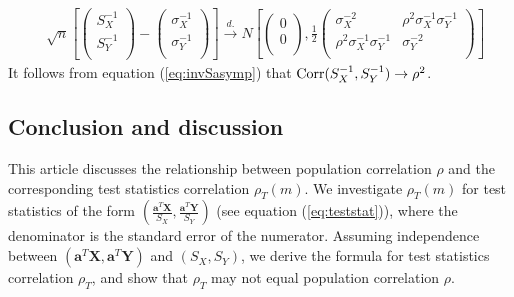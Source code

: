 \begin{equation}\label{eq:invSasymp}
\begin{aligned}
& \sqrt{n}\left[\left( \begin{array}{c}
S_X^{-1}\\
S_Y^{-1}\\
\end{array}\right)
-
\left( \begin{array}{c}
\sigma_X^{-1}\\
\sigma_Y^{-1}\\
\end{array}\right)
\right]
\stackrel{d.}{\longrightarrow} 
N\left[
\left(\begin{array}{c}
0\\
0\\
\end{array} \right), 
\frac{1}{2}\left(
\begin{array}{cc}
\sigma_X^{-2} &\rho^2\sigma_X^{-1}\sigma_Y^{-1} \\
\rho^2\sigma_X^{-1}\sigma_Y^{-1}  &\sigma_Y^{-2} \\
\end{array}
\right)
\right] 
\end{aligned}
\end{equation}
It follows from equation (\ref{eq:invSasymp}) that $\text{Corr}(S_X^{-1}, S_Y^{-1}) \rightarrow 
\rho^2$.



\subsection{Conclusion and discussion}

This article discusses the relationship between population correlation $\rho$ and the 
corresponding test statistics correlation $\rho_T(m)$. We 
investigate $\rho_T(m)$ for test statistics 
of the form $(\frac{\bm a^T\bm X}{S_X}, \frac{\bm a^T\bm Y}{S_Y})$ (see equation 
(\ref{eq:teststat})), where the denominator is the standard error of the numerator. Assuming 
independence between $(\bm a^T\bm X, \bm a^T\bm Y)$ and $(S_X, S_Y)$, we derive the formula for 
test statistics correlation $\rho_T$, and show that $\rho_T$ may not equal population 
correlation $\rho$.  

